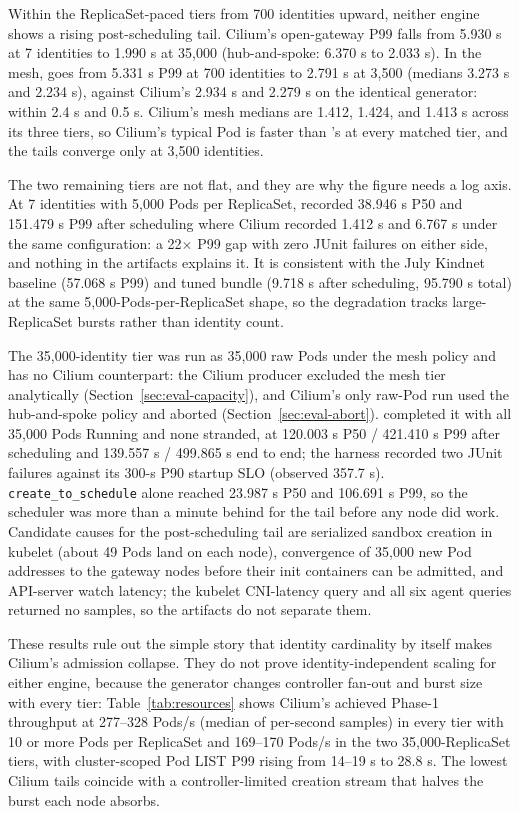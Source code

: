 Within the ReplicaSet-paced tiers from 700 identities upward, neither
engine shows a rising post-scheduling tail. Cilium's open-gateway P99
falls from 5.930 s at 7 identities to 1.990 s at 35,000 (hub-and-spoke:
6.370 s to 2.033 s). In the mesh, \sys{} goes from 5.331 s P99 at 700
identities to 2.791 s at 3,500 (medians 3.273 s and 2.234 s), against
Cilium's 2.934 s and 2.279 s on the identical generator: within 2.4 s
and 0.5 s. Cilium's mesh medians are 1.412, 1.424, and 1.413 s across
its three tiers, so Cilium's typical Pod is faster than \sys{}'s at every
matched tier, and the tails converge only at 3,500 identities.

The two remaining \sys{} tiers are not flat, and they are why the figure
needs a log axis. At 7 identities with 5,000 Pods per ReplicaSet, \sys{}
recorded 38.946 s P50 and 151.479 s P99 after scheduling where Cilium
recorded 1.412 s and 6.767 s under the same configuration: a 22$\times$
P99 gap with zero JUnit failures on either side, and nothing in the
artifacts explains it. It is consistent with the July Kindnet baseline
(57.068 s P99) and tuned bundle (9.718 s after scheduling, 95.790 s
total) at the same 5,000-Pods-per-ReplicaSet shape, so the degradation
tracks large-ReplicaSet bursts rather than identity count.

The 35,000-identity \sys{} tier was run as 35,000 raw Pods under the mesh
policy and has no Cilium counterpart: the Cilium producer excluded the
mesh tier analytically (Section~\ref{sec:eval-capacity}), and Cilium's
only raw-Pod run used the hub-and-spoke policy and aborted
(Section~\ref{sec:eval-abort}). \sys{} completed it with all 35,000 Pods
Running and none stranded, at 120.003 s P50 / 421.410 s P99 after
scheduling and 139.557 s / 499.865 s end to end; the harness recorded
two JUnit failures against its 300-s P90 startup SLO (observed 357.7 s).
\texttt{create\_to\_schedule} alone reached 23.987 s P50 and 106.691 s
P99, so the scheduler was more than a minute behind for the tail before
any node did work. Candidate causes for the post-scheduling tail are
serialized sandbox creation in kubelet (about 49 Pods land on each
node), convergence of 35,000 new Pod addresses to the gateway nodes
before their init containers can be admitted, and API-server watch
latency; the kubelet CNI-latency query and all six \sys{} agent queries
returned no samples, so the artifacts do not separate them.

These results rule out the simple story that identity cardinality by
itself makes Cilium's admission collapse. They do not prove
identity-independent scaling for either engine, because the generator
changes controller fan-out and burst size with every tier:
Table~\ref{tab:resources} shows Cilium's achieved Phase-1 throughput at
277--328 Pods/s (median of per-second samples) in every tier with 10 or
more Pods per ReplicaSet and 169--170 Pods/s in the two
35,000-ReplicaSet tiers, with cluster-scoped Pod LIST P99 rising from
14--19 s to 28.8 s. The lowest Cilium tails coincide with a
controller-limited creation stream that halves the burst each node
absorbs.

